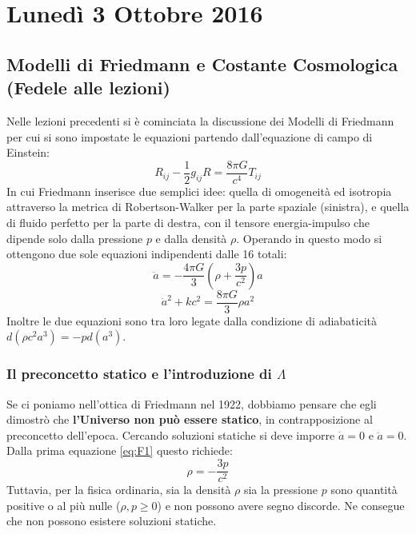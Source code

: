 \documentclass[11pt,a4paper]{report}
\begin{document}
\chapter{Lunedì 3 Ottobre 2016}

\section{Modelli di Friedmann e Costante Cosmologica (Fedele alle lezioni)}

Nelle lezioni precedenti si è cominciata la discussione dei Modelli di Friedmann per cui si sono impostate le equazioni partendo dall'equazione di campo di Einstein:
\begin{equation}
R_{ij} - \frac{1}{2}g_{ij}R = \frac{8\pi G}{c^4} T_{ij}
\label{eq:Einstein}
\end{equation}
In cui Friedmann inserisce due semplici idee: quella di omogeneità ed isotropia attraverso la metrica di Robertson-Walker per la parte spaziale (sinistra), e quella di fluido perfetto per la parte di destra, con il tensore energia-impulso che dipende solo dalla pressione $p$ e dalla densità $\rho$. Operando in questo modo si ottengono due sole equazioni indipendenti dalle 16 totali:
\begin{equation}
\ddot{a} = -\frac{4\pi G}{3} \left( \rho + \frac{3p}{c^2} \right) a
\label{eq:F1}
\end{equation}
\begin{equation}
\dot{a}^2 + kc^2 = \frac{8\pi G}{3}\rho a^2
\label{eq:F2}
\end{equation}
Inoltre le due equazioni sono tra loro legate dalla condizione di adiabaticità $d(\rho c^2 a^3) = -p d(a^3)$.

\subsection{Il preconcetto statico e l'introduzione di $\Lambda$}
Se ci poniamo nell'ottica di Friedmann nel 1922, dobbiamo pensare che egli dimostrò che \textbf{l'Universo non può essere statico}, in contrapposizione al preconcetto dell'epoca. Cercando soluzioni statiche si deve imporre $\dot{a}=0$ e $\ddot{a}=0$. Dalla prima equazione \eqref{eq:F1} questo richiede:
\begin{equation}
\rho = -\frac{3p}{c^2}
\end{equation}
Tuttavia, per la fisica ordinaria, sia la densità $\rho$ sia la pressione $p$ sono quantità positive o al più nulle ($\rho, p \geq 0$) e non possono avere segno discorde. Ne consegue che non possono esistere soluzioni statiche.
\end{document}
